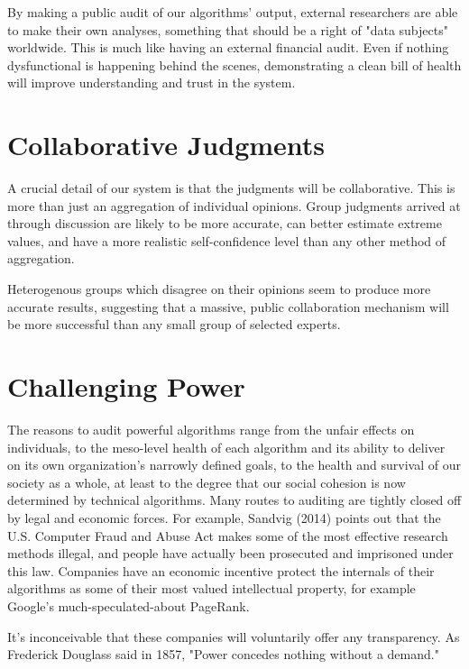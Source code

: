 \documentclass{sigchi-ext}
\begin{document}
By making a public audit of our algorithms' output, external researchers are able to make their own analyses, something that should be a right of "data subjects" worldwide.  This is much like having an external financial audit.  Even if nothing dysfunctional is happening behind the scenes, demonstrating a clean bill of health will improve understanding and trust in the system.\cite{sandvig2014auditing}

\section{Collaborative Judgments}

A crucial detail of our system is that the judgments will be collaborative.  This is more than just an aggregation of individual opinions.  Group judgments arrived at through discussion are likely to be more accurate, can better estimate extreme values, and have a more realistic self-confidence level than any other method of aggregation.\cite{sniezek1989accuracy}

Heterogenous groups which disagree on their opinions seem to produce more accurate results, suggesting that a massive, public collaboration mechanism will be more successful than any small group of selected experts.\cite{schulz2006group}

\section{Challenging Power}

The reasons to audit powerful algorithms range from the unfair effects on individuals, to the meso-level health of each algorithm and its ability to deliver on its own organization's narrowly defined goals, to the health and survival of our society as a whole, at least to the degree that our social cohesion is now determined by technical algorithms.  Many routes to auditing are tightly closed off by legal and economic forces.  For example, Sandvig (2014) points out that the U.S. Computer Fraud and Abuse Act makes some of the most effective research methods illegal, and people have actually been prosecuted and imprisoned under this law.  Companies have an economic incentive protect the internals of their algorithms as some of their most valued intellectual property, for example Google's much-speculated-about PageRank.

It's inconceivable that these companies will voluntarily offer any transparency.  As Frederick Douglass said in 1857, "Power concedes nothing without a demand."
\end{document}
